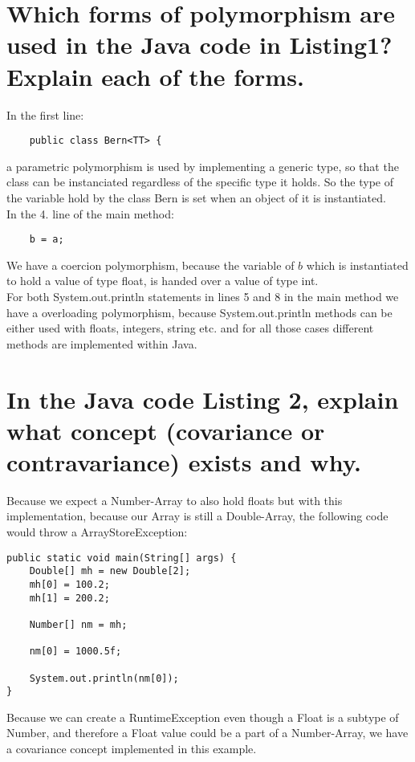 \documentclass{report}
\begin{document}
	\section{Which forms of polymorphism are used in the Java code in Listing1? Explain each of the forms.}
	\startsection
		In the first line:
		\begin{verbatim}
	public class Bern<TT> {
		\end{verbatim}
		a parametric polymorphism is used by implementing a generic type, so that the class can be instanciated regardless of the specific type it holds. So the type of the variable hold by the class Bern is set when an object of it is instantiated. \\
		In the 4. line of the main method:
		\begin{verbatim}
	b = a;
		\end{verbatim}
		We have a coercion polymorphism, because the variable of $b$ which is instantiated to hold a value of type float, is handed over a value of type int. \\
		For both System.out.println statements in lines 5 and 8 in the main method we have a overloading polymorphism, because System.out.println methods can be either used with floats, integers, string etc. and for all those cases different methods are implemented within Java.
	\closesection
	
	\section{In the Java code Listing 2, explain what concept (covariance or contravariance) exists and why.}
	\startsection
		Because we expect a Number-Array to also hold floats but with this implementation, because our Array is still a Double-Array, the following code would throw a ArrayStoreException:
		\begin{verbatim}
public static void main(String[] args) {
	Double[] mh = new Double[2];
	mh[0] = 100.2;
	mh[1] = 200.2;
	
	Number[] nm = mh;
	
	nm[0] = 1000.5f;
	
	System.out.println(nm[0]);
}
		\end{verbatim}
		Because we can create a RuntimeException even though a Float is a subtype of Number, and therefore a Float value could be a part of a Number-Array, we have a covariance concept implemented in this example.
	\closesection
\end{document}
